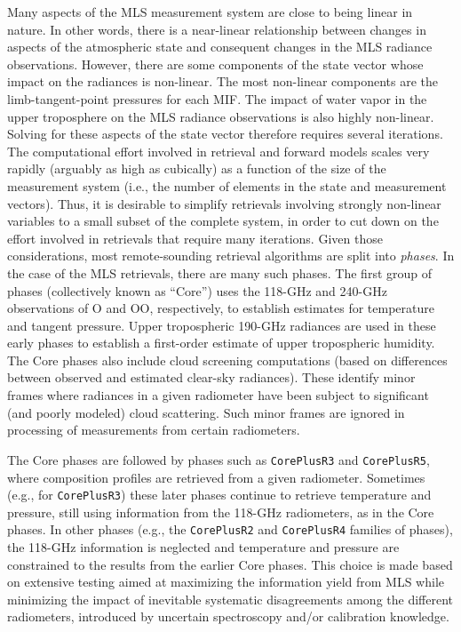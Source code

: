 Many aspects of the MLS measurement system are close to being linear in nature. In other words, there is a near-linear relationship between changes in aspects of the atmospheric state and consequent changes in the MLS radiance observations. However, there are some components of the state vector whose impact on the radiances is non-linear. The most non-linear components are the limb-tangent-point pressures for each MIF. The impact of water vapor in the upper troposphere on the MLS radiance observations is also highly non-linear. Solving for these aspects of the state vector therefore requires several iterations.  The computational effort involved in retrieval and forward models scales very rapidly (arguably as high as cubically) as a function of the size of the measurement system (i.e., the number of elements in the state and measurement vectors). Thus, it is desirable to simplify retrievals involving strongly non-linear variables to a small subset of the complete system, in order to cut down on the effort involved in retrievals that require many iterations.  Given those considerations, most remote-sounding retrieval algorithms are split into \emph{phases}. In the case of the MLS \thisv retrievals, there are many such phases. The first group of phases (collectively known as ``Core'') uses the 118\nobreakdash-GHz and 240\nobreakdash-GHz observations of O and OO, respectively, to establish estimates for temperature and tangent pressure. Upper tropospheric 190\nobreakdash-GHz radiances are used in these early phases to establish a first-order estimate of upper tropospheric humidity. The Core phases also include cloud screening computations (based on differences between observed and estimated clear-sky radiances). These identify minor frames where radiances in a given radiometer have been subject to significant (and poorly modeled) cloud scattering. Such minor frames are ignored in \thisv processing of measurements from certain radiometers.

The Core phases are followed by phases such as \texttt{CorePlusR3} and \texttt{CorePlusR5}, where composition profiles are retrieved from a given radiometer. Sometimes (e.g., for \texttt{CorePlusR3}) these later phases continue to retrieve temperature and pressure, still using information from the 118\nobreakdash-GHz radiometers, as in the Core phases. In other phases (e.g., the \texttt{CorePlusR2} and \texttt{CorePlusR4} families of phases), the 118\nobreakdash-GHz information is neglected and temperature and pressure are constrained to the results from the earlier Core phases. This choice is made based on extensive testing aimed at maximizing the information yield from MLS while minimizing the impact of inevitable systematic disagreements among the different radiometers, introduced by uncertain spectroscopy and/or calibration knowledge.

